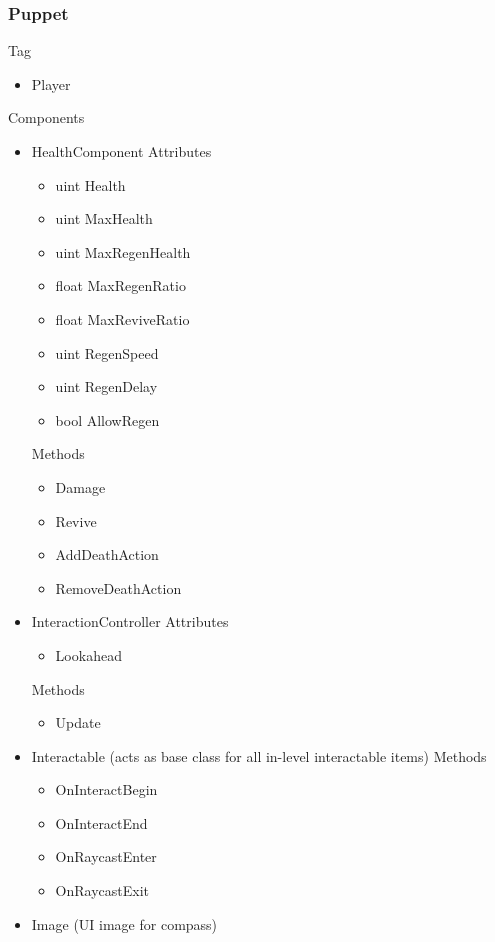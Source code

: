 \documentclass[11pt]{article}
\begin{document}
\subsubsection{Puppet}
Tag
\begin{itemize}
	\item Player
\end{itemize}
Components
\begin{itemize}
	\item HealthComponent
	\newline Attributes
	\begin{itemize}
		\item uint Health
		\item uint MaxHealth
		\item uint MaxRegenHealth
		\item float MaxRegenRatio
		\item float MaxReviveRatio
		\item uint RegenSpeed
		\item uint RegenDelay
		\item bool AllowRegen
	\end{itemize}
	Methods
	\begin{itemize}
		\item Damage
		\item Revive
		\item AddDeathAction
		\item RemoveDeathAction
	\end{itemize}
	\item InteractionController
	\newline Attributes
	\begin{itemize}
		\item Lookahead
	\end{itemize}
	Methods
	\begin{itemize}
		\item Update
	\end{itemize}
	\item Interactable (acts as base class for all in-level interactable items)
	\newline Methods
	\begin{itemize}
		\item OnInteractBegin
		\item OnInteractEnd
		\item OnRaycastEnter
		\item OnRaycastExit
	\end{itemize}
	\item Image (UI image for compass)

\end{itemize}
\end{document}
